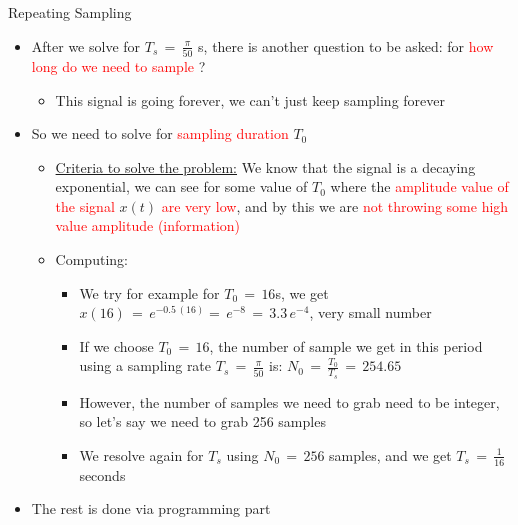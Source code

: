 \documentclass{beamer}
\begin{document}
\begin{frame}[t,allowframebreaks]{Repeating Sampling}

\begin{itemize}

\item After we solve for $T_s \, = \, \displaystyle\frac{\pi}{50}$ s, there is another question to be asked: for \textcolor{red}{how long do we need to sample} ?

	\begin{itemize}
	\item This signal is going forever, we can't just keep sampling forever
	\end{itemize}

\item So we need to solve for \textcolor{red}{sampling duration} $T_0$

	\begin{itemize}
	\item \underline{Criteria to solve the problem:} We know that the signal is a decaying exponential, we can see for some value of $T_0$ where the  \textcolor{red}{amplitude value of the signal} $x(t)$  \textcolor{red}{are very low}, and by this we are  \textcolor{red}{not throwing some high value amplitude (information)}
	
	\item Computing: 
	
	\begin{itemize}
	\item We try for example for $T_0 \, = \, 16$s, we get $x(16) \, = \, e^{-0.5 \, (16)} = \, e^{-8} \, = \, 3.3 \, e^{-4}$, very small number
	
	\item If we choose $T_0 \, = \, 16$, the number of sample we get in this period using a sampling rate $T_s \, = \, \displaystyle\frac{\pi}{50}$ is: $N_0 \, = \, \displaystyle\frac{T_0}{T_s} \, = \, 254.65$
	
	
	\item However, the number of samples we need to grab need to be integer, so let's say we need to grab 256 samples
	
	\item We resolve again for $T_s$ using $N_0 \, = \, 256$ samples, and we get $T_s \, = \, \displaystyle\frac{1}{16}$ seconds 
\end{itemize}		
	
	\end{itemize}

\item The rest is done via programming part


\end{itemize}
\end{frame}
\end{document}
